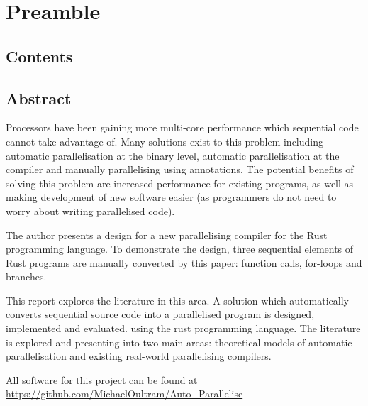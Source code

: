 \chapter{Preamble}
\section{Contents}
\makeatletter
\newcommand*{\toccontents}{}
\makeatother
\toccontents

\section{Abstract}
Processors have been gaining more multi-core performance which sequential code cannot take advantage of. Many solutions exist to this problem including automatic parallelisation at the binary level, automatic parallelisation at the compiler and manually parallelising using annotations. The potential benefits of solving this problem are increased performance for existing programs, as well as making development of new software easier (as programmers do not need to worry about writing parallelised code).

The author presents a design for a new parallelising compiler for the Rust programming language. To demonstrate the design, three sequential elements of Rust programs are manually converted by this paper: function calls, for-loops and branches.

This report explores the literature in this area. A solution which automatically converts sequential source code into a parallelised program is designed, implemented and evaluated. using the rust programming language. The literature is explored and presenting into two main areas: theoretical models of automatic parallelisation and existing real-world parallelising compilers.


\begin{center}
All software for this project can be found at \\
\url{https://github.com/MichaelOultram/Auto\_Parallelise}
\end{center}

\begin{comment}
\section{Acknowledgements}
Rust Compiler (\url{https://github.com/rust-lang/rust})

Serde (\url{https://serde.rs/}): used to convert rust objects into JSON and back again
\end{comment}
